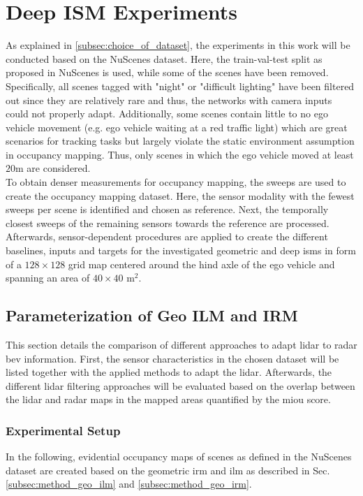 \chapter{Deep ISM Experiments}
\label{ch:deep_ism_exp}
As explained in \ref{subsec:choice_of_dataset}, the experiments in this work will be conducted based on the NuScenes dataset. Here, the train-val-test split as proposed in NuScenes is used, while some of the scenes have been removed. Specifically, all scenes tagged with "night" or "difficult lighting" have been filtered out since they are relatively rare and thus, the networks with camera inputs could not properly adapt. Additionally, some scenes contain little to no ego vehicle movement (e.g. ego vehicle waiting at a red traffic light) which are great scenarios for tracking tasks but largely violate the static environment assumption in occupancy mapping. Thus, only scenes in which the ego vehicle moved at least $20$m are considered.
\\
To obtain denser measurements for occupancy mapping, the sweeps are used to create the occupancy mapping dataset. Here, the sensor modality with the fewest sweeps per scene is identified and chosen as reference. Next, the temporally closest sweeps of the remaining sensors towards the reference are processed. Afterwards, sensor-dependent procedures are applied to create the different baselines, inputs and targets for the investigated geometric and deep \gls{ism}s in form of a $128\times 128$ grid map centered around the hind axle of the ego vehicle and spanning an area of $40 \times 40$ m$^2$.
%
\section{Parameterization of Geo ILM and IRM}
\label{sec:choice_of_gt}
This section details the comparison of different approaches to adapt lidar to radar \gls{bev} information. First, the sensor characteristics in the chosen dataset will be listed together with the applied methods to adapt the lidar. Afterwards, the different lidar filtering approaches will be evaluated based on the overlap between the lidar and radar maps in the mapped areas quantified by the m\gls{iou} score. 
%
\subsection{Experimental Setup}
\label{subsec:exp_setup_gt}
In the following, evidential occupancy maps of scenes as defined in the NuScenes dataset are created based on the geometric \gls{irm} and \gls{ilm} as described in Sec. \ref{subsec:method_geo_ilm} and \ref{subsec:method_geo_irm}. 

